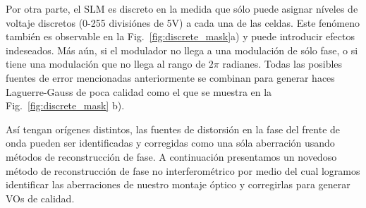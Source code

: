 Por otra parte, el SLM es discreto en la medida que sólo puede asignar
níveles de voltaje discretos (0-255 divisiónes de 5V) a cada una de
las celdas. Este fenómeno también es observable en la
Fig.~\ref{fig:discrete_mask}a) y puede introducir efectos 
indeseados. Más aún, si el modulador no llega a una
modulación de sólo fase, o si tiene una modulación que no llega al
rango de $2\pi$ radianes.  
Todas las posibles fuentes de error mencionadas anteriormente se
combinan para generar haces Laguerre-Gauss de poca calidad como el que se muestra
en la Fig.~\ref{fig:discrete_mask} b). 

Así tengan orígenes distintos, las fuentes de distorsión en
la fase del frente de onda pueden ser identificadas y corregidas como
una sóla aberración usando métodos de reconstrucción de fase. A
continuación presentamos un novedoso método de reconstrucción de fase
no interferométrico por medio del cual logramos identificar las
aberraciones de nuestro montaje óptico y corregirlas para generar VOs
de calidad.   

